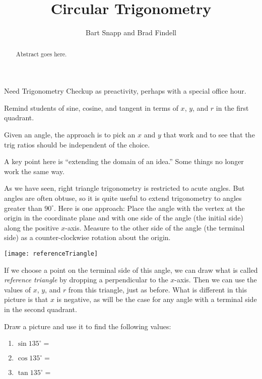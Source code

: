 \documentclass{ximera}
\title{Circular Trigonometry}
\author{Bart Snapp and Brad Findell}
\begin{document}
\begin{abstract}
Abstract goes here.  
\end{abstract}
\maketitle

\begin{teachingnote}
Need Trigonometry Checkup as preactivity, perhaps with a special office hour.  

Remind students of sine, cosine, and tangent in terms of $x$, $y$, and $r$ in the first quadrant.  

Given an angle, the approach is to pick an $x$ and $y$ that work and to see that the trig ratios should be independent of the choice.  

A key point here is ``extending the domain of an idea.''  Some things no longer work the same way.
\end{teachingnote}

As we have seen, right triangle trigonometry is restricted to acute angles.  But angles are often obtuse, so it is quite useful to extend trigonometry to angles greater than $90^\circ$.  Here is one approach:  Place the angle with the vertex at the origin in the coordinate plane and with one side of the angle (the initial side) along the positive $x$-axis.  
Measure to the other side of the angle (the terminal side) as a counter-clockwise rotation about the origin.   

\begin{image}
\texttt{[image: referenceTriangle]}
\end{image}

If we choose a point on the terminal side of this angle, we can draw what is called \emph{reference triangle} by dropping a perpendicular to the $x$-axis.  Then we can use the values of $x$, $y$, and $r$ from this triangle, just as before.  What is different in this picture is that $x$ is negative, as will be the case for any angle with a terminal side in the second quadrant.  


\begin{problem}
Draw a picture and use it to find the following values: 
\begin{enumerate}
\item $\sin 135^\circ = $
\item $\cos 135^\circ =$
\item $\tan 135^\circ =$
\end{enumerate}
\end{problem}
\end{document}
